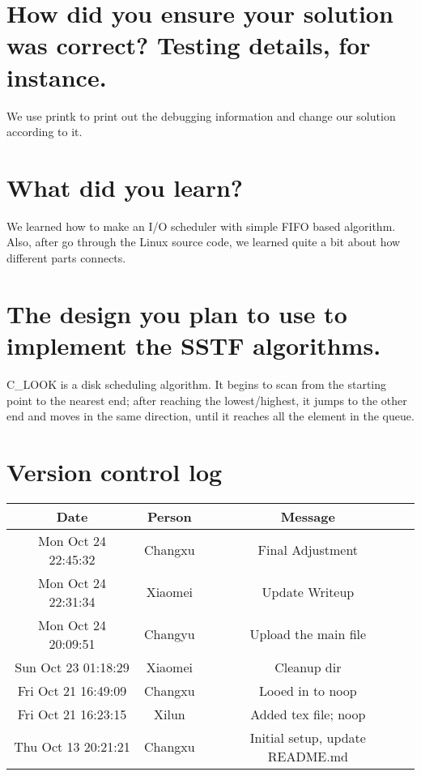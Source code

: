 \documentclass[letterpaper,10pt]{article}
\begin{document}
\section*{How did you ensure your solution was correct? Testing details, for instance.}

We use printk to print out the debugging information and change our solution according to it.

\section*{What did you learn?}

We learned how to make an I/O scheduler with simple FIFO based algorithm. Also, after go through the Linux source code, we learned quite a bit about how different parts connects.

\section*{The design you plan to use to implement the SSTF algorithms.}

C\_LOOK is a disk scheduling algorithm. It begins to scan from the starting point to the nearest end; after reaching the lowest/highest, it jumps to the other end and moves in the same direction, until it reaches all the element in the queue.


\section*{Version control log}
\begin{tabular}{@{}ccc@{}}
    \toprule
    Date                & Person   & Message                                                   \\ \midrule
    Mon Oct 24 22:45:32 & Changxu  & Final Adjustment                                          \\
    Mon Oct 24 22:31:34 & Xiaomei  & Update Writeup                                            \\
    Mon Oct 24 20:09:51 & Changyu  & Upload the main file                                      \\
    Sun Oct 23 01:18:29 & Xiaomei  & Cleanup dir                                               \\
    Fri Oct 21 16:49:09 & Changxu  & Looed in to noop                                          \\
    Fri Oct 21 16:23:15 & Xilun    & Added tex file; noop                                      \\
    Thu Oct 13 20:21:21 & Changxu  & Initial setup, update README.md                           \\ \bottomrule
\end{tabular}
\end{document}
